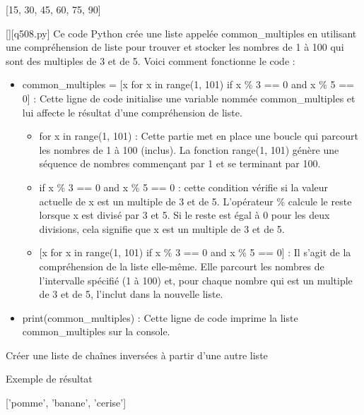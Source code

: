 [15, 30, 45, 60, 75, 90]
        \par
        \begin{solution}
            \renewcommand{\nomfichier}{q508.py}
            \pythonfile{\chemincode \nomfichier}[][\nomfichier]
            Ce code Python crée une liste appelée common\_multiples en utilisant une compréhension de liste pour trouver et stocker les nombres de 1 à 100 qui sont des multiples de 3 et de 5. Voici comment fonctionne le code :

\begin{itemize}
	\item     common\_multiples = [x for x in range(1, 101) if x \% 3 == 0 and x \% 5 == 0] : Cette ligne de code initialise une variable nommée common\_multiples et lui affecte le résultat d'une compréhension de liste.

       \begin{itemize}
       	\item  for x in range(1, 101) : Cette partie met en place une boucle qui parcourt les nombres de 1 à 100 (inclus). La fonction range(1, 101) génère une séquence de nombres commençant par 1 et se terminant par 100.
       	\item         if x \% 3 == 0 and x \% 5 == 0 : cette condition vérifie si la valeur actuelle de x est un multiple de 3 et de 5. L'opérateur \% calcule le reste lorsque x est divisé par 3 et 5. Si le reste est égal à 0 pour les deux divisions, cela signifie que x est un multiple de 3 et de 5.
       	\item{}         [x for x in range(1, 101) if x \% 3 == 0 and x \% 5 == 0] : Il s'agit de la compréhension de la liste elle-même. Elle parcourt les nombres de l'intervalle spécifié (1 à 100) et, pour chaque nombre qui est un multiple de 3 et de 5, l'inclut dans la nouvelle liste.
       \end{itemize}
    \item print(common\_multiples) : Cette ligne de code imprime la liste common\_multiples sur la console.
   \end{itemize}
        \end{solution}
        

        \question
        Créer une liste de chaînes inversées à partir d'une autre liste

Exemple de résultat

['pomme', 'banane', 'cerise']

